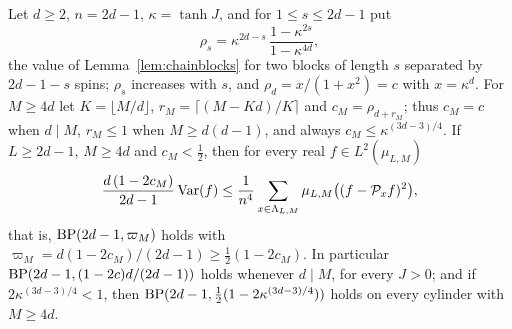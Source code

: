 \begin{proposition}\label{prop:ringsBP}
Let $d\ge2$, $n=2d-1$, $\kappa=\tanh J$, and for $1\le s\le2d-1$ put
\[
\rho_s=\kappa^{2d-s}\,\frac{1-\kappa^{2s}}{1-\kappa^{4d}},
\]
the value of Lemma~\ref{lem:chainblocks} for two blocks of length $s$
separated by $2d-1-s$ spins; $\rho_s$ increases with $s$, and $\rho_d=
x/(1+x^2)=c$ with $x=\kappa^d$. For $M\ge4d$ let $K=\lfloor M/d\rfloor$,
$r_M=\lceil(M-Kd)/K\rceil$ and $c_M=\rho_{d+r_M}$; thus $c_M=c$ when $d\mid
M$, $r_M\le1$ when $M\ge d(d-1)$, and always $c_M\le\kappa^{(3d-3)/4}$. If
$L\ge2d-1$, $M\ge4d$ and $c_M<\frac12$, then for every real $f\in
L^2(\mu_{L,M})$
\[
\frac{d\,(1-2c_M)}{2d-1}\operatorname{Var}(f)\le\frac1{n^4}\sum_{x\in\Lambda_{L,M}}
\mu_{L,M}\bigl((f-\mathcal P_xf)^2\bigr),
\]
that is, $\mathrm{BP}(2d-1,\varpi_M)$ holds with $\varpi_M=d(1-2c_M)/(2d-1)\ge\frac12
(1-2c_M)$. In particular $\mathrm{BP}(2d-1,(1-2c)d/(2d-1))$ holds whenever $d\mid M$,
for every $J>0$; and if $2\kappa^{(3d-3)/4}<1$, then $\mathrm{BP}(2d-1,\frac12(1-2
\kappa^{(3d-3)/4}))$ holds on every cylinder with $M\ge4d$.
\end{proposition}

